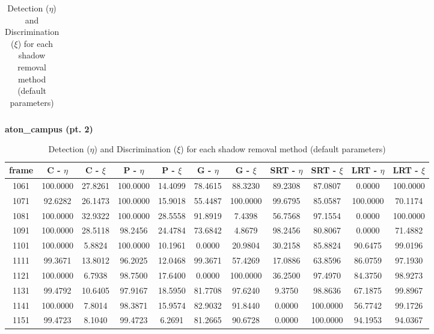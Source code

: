 \begin{appendices}
\begin{table}
\begin{tabular}{ |c|c|c|c|c|c|c|c|c|c|c| }
\hline
\end{tabular}
\caption*{Detection ($\eta$) and Discrimination ($\xi$) for each shadow removal method (default parameters)}
\end{table}

\begin{table}
\centering
\caption{\textbf{aton\_campus (pt. 2)}}
\begin{tabular}{ |c|c|c|c|c|c|c|c|c|c|c| }
	\hline
\textbf{frame} &  \textbf{C - $\eta$} &  \textbf{C - $\xi$} &  \textbf{P - $\eta$} &  \textbf{P - $\xi$} &  \textbf{G - $\eta$} &  \textbf{G - $\xi$} &  \textbf{SRT - $\eta$} &  \textbf{SRT - $\xi$} &  \textbf{LRT - $\eta$} &  \textbf{LRT - $\xi$} \\
\hline
\hline
1061 &  100.0000 &  27.8261 &   100.0000 &  14.4099 &   78.4615 &  88.3230 &   89.2308 &  87.0807 &   0.0000 &  100.0000    \\
\hline
1071 &  92.6282 &  26.1473 &   100.0000 &  15.9018 &   55.4487 &  100.0000 &   99.6795 &  85.0587 &   100.0000 &  70.1174    \\
\hline
1081 &  100.0000 &  32.9322 &   100.0000 &  28.5558 &   91.8919 &  7.4398 &   56.7568 &  97.1554 &   0.0000 &  100.0000   \\
\hline
1091 &  100.0000 &  28.5118 &   98.2456 &  24.4784 &   73.6842 &  4.8679 &   98.2456 &  80.8067 &   0.0000 &  71.4882    \\
\hline
1101 &  100.0000 &  5.8824 &   100.0000 &  10.1961 &   0.0000 &  20.9804 &   30.2158 &  85.8824 &   90.6475 &  99.0196    \\
\hline
1111 &  99.3671 &  13.8012 &   96.2025 &  12.0468 &   99.3671 &  57.4269 &   17.0886 &  63.8596 &   86.0759 &  97.1930    \\
\hline
1121 &  100.0000 &  6.7938 &   98.7500 &  17.6400 &   0.0000 &  100.0000 &   36.2500 &  97.4970 &   84.3750 &  98.9273    \\
\hline
1131 &  99.4792 &  10.6405 &   97.9167 &  18.5950 &   81.7708 &  97.6240 &   9.3750 &  98.8636 &   67.1875 &  99.8967    \\
\hline
1141 &  100.0000 &  7.8014 &   98.3871 &  15.9574 &   82.9032 &  91.8440 &   0.0000 &  100.0000 &   56.7742 &  99.1726   \\
\hline
1151 &  99.4723 &  8.1040 &   99.4723 &  6.2691 &   81.2665 &  90.6728 &   0.0000 &  100.0000 &   94.1953 &  94.0367   \\

\hline
\end{tabular}
\caption*{Detection ($\eta$) and Discrimination ($\xi$) for each shadow removal method (default parameters)}
\end{table}


\end{appendices}
